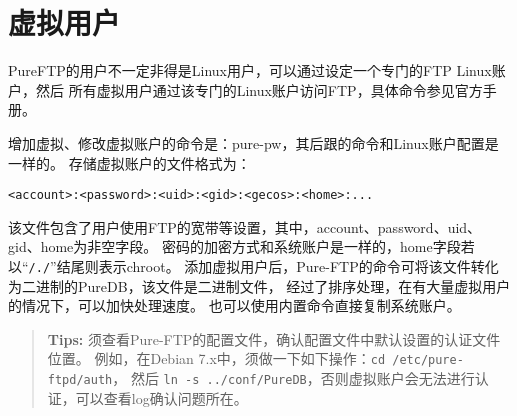 \section{虚拟用户}
PureFTP的用户不一定非得是Linux用户，可以通过设定一个专门的FTP Linux账户，然后%
所有虚拟用户通过该专门的Linux账户访问FTP，具体命令参见官方手册。

增加虚拟、修改虚拟账户的命令是：pure-pw，其后跟的命令和Linux账户配置是一样的。%
存储虚拟账户的文件格式为：

\begin{Verbatim}[]
<account>:<password>:<uid>:<gid>:<gecos>:<home>:...
\end{Verbatim}

该文件包含了用户使用FTP的宽带等设置，其中，account、password、uid、gid、home为非空字段。
密码的加密方式和系统账户是一样的，home字段若以“\verb"/./"”结尾则表示chroot。%
添加虚拟用户后，Pure-FTP的命令可将该文件转化为二进制的PureDB，该文件是二进制文件，%
经过了排序处理，在有大量虚拟用户的情况下，可以加快处理速度。%
也可以使用内置命令直接复制系统账户。%

\begin{quote}\kaishu
\textbf{Tips:} 须查看Pure-FTP的配置文件，确认配置文件中默认设置的认证文件位置。%
例如，在Debian 7.x中，须做一下如下操作：\verb"cd /etc/pure-ftpd/auth"，%
然后 \verb"ln -s ../conf/PureDB"，否则虚拟账户会无法进行认证，可以查看log确认问题所在。
\end{quote}
